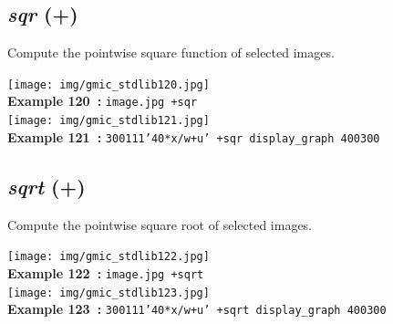 \documentclass[a4paper,10.5pt,twoside]{book}
\def\comma{\discretionary{,}{}{,}}
\begin{document}
\subsection{\emph{sqr} (+)}\vspace*{-0.7em}
Compute the pointwise square function of selected images.
\begin{center}\texttt{[image: img/gmic\_stdlib120.jpg]}\\
{\footnotesize \textbf{Example 120~:} \texttt{image.jpg +sqr}}
\\\texttt{[image: img/gmic\_stdlib121.jpg]}\\
{\footnotesize \textbf{Example 121~:} \texttt{300{\comma}1{\comma}1{\comma}1{\comma}'40*x/w+u' +sqr display\_graph 400{\comma}300}}
\end{center}

\subsection{\emph{sqrt} (+)}\vspace*{-0.7em}
Compute the pointwise square root of selected images.
\begin{center}\texttt{[image: img/gmic\_stdlib122.jpg]}\\
{\footnotesize \textbf{Example 122~:} \texttt{image.jpg +sqrt}}
\\\texttt{[image: img/gmic\_stdlib123.jpg]}\\
{\footnotesize \textbf{Example 123~:} \texttt{300{\comma}1{\comma}1{\comma}1{\comma}'40*x/w+u' +sqrt display\_graph 400{\comma}300}}
\end{center}
\end{document}
